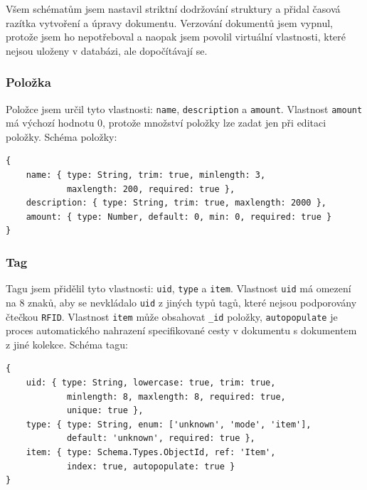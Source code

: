 \documentclass[czech,BP]{thesiskiv}
\begin{document}
	Všem schématům jsem nastavil striktní dodržování struktury a přidal časová razítka vytvoření a úpravy dokumentu.
	Verzování dokumentů jsem vypnul, protože jsem ho nepotřeboval a naopak jsem povolil virtuální vlastnosti, které nejsou uloženy v databázi, ale dopočítávají se.
	
	
	\subsubsection{Položka}
Položce jsem určil tyto vlastnosti: \texttt{name}, \texttt{description} a \texttt{amount}. Vlastnost \texttt{amount} má výchozí hodnotu 0, protože množství položky lze zadat jen při editaci položky. 
Schéma položky:	
\begin{verbatim}
{
    name: { type: String, trim: true, minlength: 3,
            maxlength: 200, required: true },
    description: { type: String, trim: true, maxlength: 2000 },
    amount: { type: Number, default: 0, min: 0, required: true }
}
\end{verbatim}

	\subsubsection{Tag}
Tagu jsem přidělil tyto vlastnosti: \texttt{uid}, \texttt{type} a \texttt{item}. Vlastnost \texttt{uid} má omezení na 8 znaků, aby se nevkládalo \texttt{uid} z jiných typů tagů, které nejsou podporovány čtečkou \texttt{RFID}.
Vlastnost \texttt{item} může obsahovat \texttt{\_id} položky, \texttt{autopopulate} je proces automatického nahrazení specifikované cesty v dokumentu s dokumentem z jiné kolekce.
Schéma tagu:
\begin{verbatim}
{
    uid: { type: String, lowercase: true, trim: true,
            minlength: 8, maxlength: 8, required: true,
            unique: true },
    type: { type: String, enum: ['unknown', 'mode', 'item'],
            default: 'unknown', required: true },
    item: { type: Schema.Types.ObjectId, ref: 'Item',
            index: true, autopopulate: true }
}
\end{verbatim}
	
\end{document}
